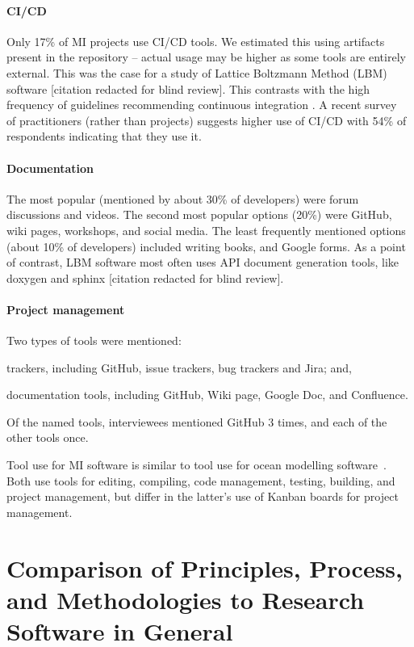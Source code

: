 \documentclass[doubleblind,12pt, 3p, times]{elsarticle}
\begin{document}
\paragraph{CI/CD} 
Only 17\% of MI projects use CI/CD tools. We estimated this using artifacts
present in the repository -- actual usage may be higher as some tools are
entirely external. This was the case for a study of Lattice Boltzmann Method
(LBM) software [citation redacted for blind review].  %
This contrasts with the high frequency of guidelines recommending continuous
integration
\cite{BrettEtAl2021, Brown2015, ThielEtAl2020, Zadka2018, vanGompelEtAl2016}.
A recent survey~\cite{CarverEtAl2022} of practitioners (rather than projects)
suggests higher use of CI/CD with 54\% of respondents indicating that they use
it.

\paragraph{Documentation} The most popular (mentioned by about 30\% of
developers) were forum discussions and videos.  The second most popular options
(20\%) were GitHub, wiki pages, workshops, and social media. The least
frequently mentioned options (about 10\% of developers) included writing books,
and Google forms.  As a point of contrast, LBM software most often uses API
document generation tools, like doxygen and sphinx [citation redacted for blind
review].

\paragraph{Project management} Two types of tools were mentioned:
\begin{inparaenum}[i)]
\item trackers, including GitHub, issue trackers, bug trackers and Jira; and,
\item documentation tools, including GitHub, Wiki page, Google Doc, and
Confluence.
\end{inparaenum}
Of the named tools, interviewees mentioned GitHub 3 times, and each
of the other tools once.

Tool use for MI software is similar to tool use for ocean modelling
software~\cite{JungEtAl2022}.  Both use tools for editing, compiling, code
management, testing, building, and project management, but differ in the
latter's use of Kanban boards for project management.

\section[Comparison to Other Research Software]{Comparison of Principles, Process, and
Methodologies to Research Software in General} \label{Sec_CompareMethodologies}
\end{document}
